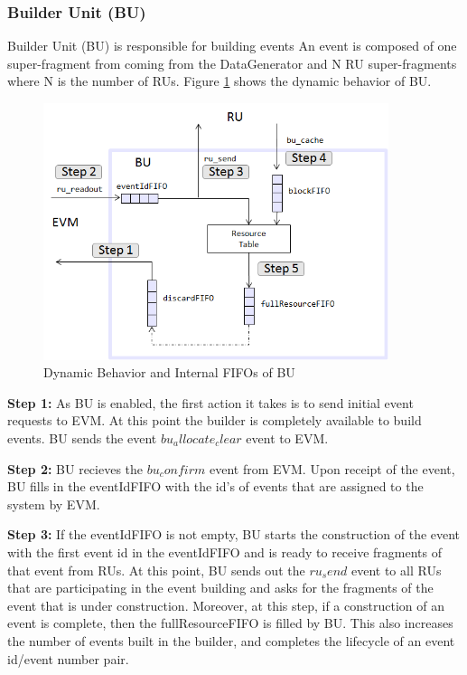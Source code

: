 \subsubsection{Builder Unit (BU)}
Builder Unit (BU) is responsible for building events  An event is composed of one super-fragment from coming from the DataGenerator and N RU super-fragments where N is the number of RUs. Figure \ref{fig:bu_behavior} shows the dynamic behavior of BU.

\begin{figure}
 \centering
 \includegraphics[width=0.90\textwidth]{figures/bu_behavior.png}
 \caption{Dynamic Behavior and Internal FIFOs of BU}
 \label{fig:bu_behavior}
\end{figure}


\textbf{Step 1:} As BU is enabled, the first action it takes is to send initial event requests to EVM. At this point the builder is completely available to build events. BU sends the event $bu_allocate_clear$ event to EVM.

\textbf{Step 2:} BU recieves the $bu_confirm$ event from EVM. Upon receipt of the event, BU fills in the eventIdFIFO with the id's of events that are assigned to the system by EVM. 

\textbf{Step 3:} If the eventIdFIFO is not empty, BU starts the construction of the event with the first event id in the eventIdFIFO and is ready to receive fragments of that event from RUs. At this point, BU sends out the $ru_send$ event to all RUs that are participating in the event building and asks for the fragments of the event that is under construction. Moreover, at this step, if a construction of an event is complete, then the fullResourceFIFO is filled by BU. This also increases the number of events built in the builder, and completes the lifecycle of an event id/event number pair.

